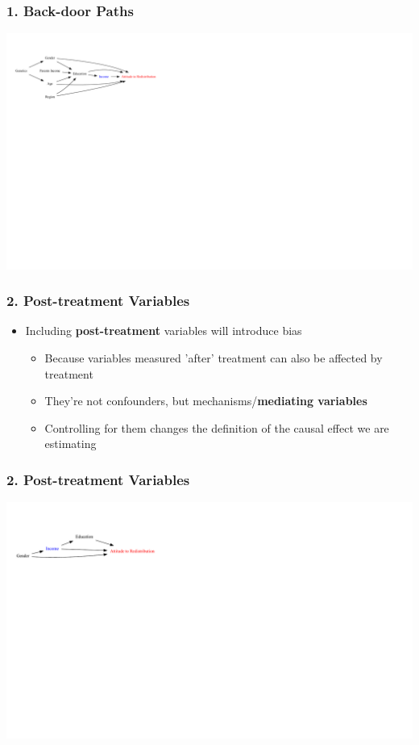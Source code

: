 \documentclass[xcolor=x11names,compress]{beamer}\usepackage[]{graphicx}\usepackage[]{color}
\newenvironment{knitrout}{}{} %
\renewcommand{\(}{\begin{columns}}
\renewcommand{\)}{\end{columns}}
\newcommand{\<}[1]{\begin{column}{#1}}
\renewcommand{\>}{\end{column}}
\begin{document}
\begin{frame}
\frametitle{1. Back-door Paths}
\begin{knitrout}
\color{fgcolor}
\includegraphics[width=2.7\linewidth]{figure/Dag4_paths_c-1} 

\end{knitrout}
\end{frame}

\begin{frame}
\frametitle{2. Post-treatment Variables}
\begin{itemize}
\item Including \textbf{post-treatment} variables will introduce bias
\pause
\begin{itemize}
\item Because variables measured 'after' treatment can also be affected by treatment
\pause
\item They're not confounders, but mechanisms/\textbf{mediating variables}
\pause
\item Controlling for them changes the definition of the causal effect we are estimating
\end{itemize}
\end{itemize}
\end{frame}

\begin{frame}
\frametitle{2. Post-treatment Variables}
\begin{knitrout}
\color{fgcolor}
\includegraphics[width=2.7\linewidth]{figure/Dag4-1} 

\end{knitrout}
\end{frame}
\end{document}
